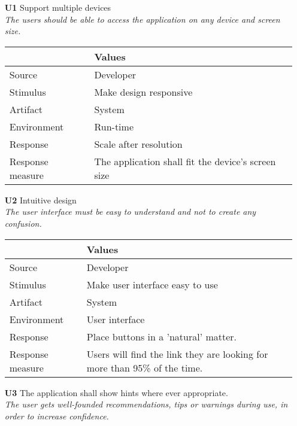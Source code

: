 \begin{itemize}
    \item[\textbf{U1}] Support multiple devices \\
    \textit{\small{The users should be able to access the application on any device and screen size.}}
        
    \begin{tabular}{| l | p{7cm} |}
        \hline
        \rowcolor[gray]{0.8}
        \textbf{} & \textbf{Values} \\
        \hline
        Source & Developer \\
        Stimulus & Make design responsive \\
        Artifact & System \\
        Environment & Run-time \\
        Response & Scale after resolution  \\
        Response measure & The application shall fit the device's screen size \\
        \hline
    \end{tabular}   

    \item[\textbf{U2}] Intuitive design \\
    \textit{\small{The user interface must be easy to understand and not to create any confusion.}}
        
    \begin{tabular}{| l | p{7cm} |}
        \hline
        \rowcolor[gray]{0.8}
        \textbf{} & \textbf{Values} \\
        \hline
        Source & Developer \\
        Stimulus & Make user interface easy to use \\
        Artifact & System \\
        Environment & User interface \\
        Response & Place buttons in a 'natural' matter. \\
        Response measure & Users will find the link they are looking for more than 95\% of the time. \\
        \hline
    \end{tabular}

    \item[\textbf{U3}] The application shall show hints where ever appropriate. \\
        \textit{\small{The user gets well-founded recommendations, tips or warnings during use, in order to increase confidence.}}
        

\end{itemize}

